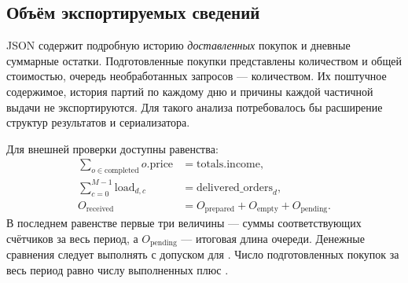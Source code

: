 \subsection{Объём экспортируемых сведений}
JSON содержит подробную историю \emph{доставленных} покупок и дневные
суммарные остатки. Подготовленные покупки представлены количеством и
общей стоимостью, очередь необработанных запросов --- количеством.
Их поштучное содержимое, история партий по каждому дню и причины каждой
частичной выдачи не экспортируются. Для такого анализа потребовалось бы
расширение структур результатов и сериализатора.

Для внешней проверки доступны равенства:
\begin{align}
  \sum_{o\in\mathrm{completed}} o.\mathrm{price}
    &= \mathrm{totals.income},\\
  \sum_{c=0}^{M-1}\mathrm{load}_{d,c}
    &= \mathrm{delivered\_orders}_d,\\
  O_{\mathrm{received}}&=O_{\mathrm{prepared}}+O_{\mathrm{empty}}
                        +O_{\mathrm{pending}}.
\end{align}
В последнем равенстве первые три величины --- суммы соответствующих
счётчиков за весь период, а $O_{\mathrm{pending}}$ --- итоговая длина очереди.
Денежные сравнения следует выполнять с допуском для .
Число подготовленных покупок за весь период равно числу выполненных
плюс .
